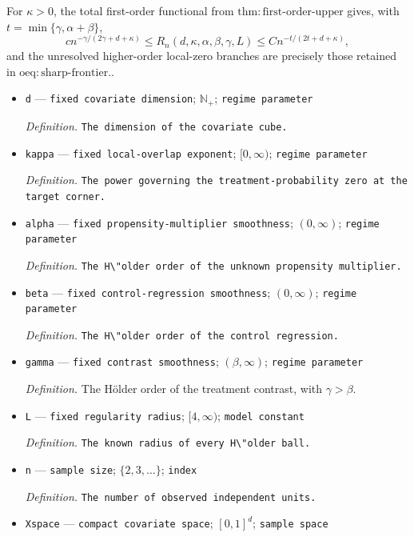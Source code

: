 \documentclass{article}
\begin{document}
For \(\kappa>0\), the total first-order functional from \(\mathrm{thm:first\mbox{-}order\mbox{-}upper}\) gives, with \(t=\min\{\gamma,\alpha+\beta\}\),
\[
 c n^{-\gamma/(2\gamma+d+\kappa)}
 \leq R_n(d,\kappa,\alpha,\beta,\gamma,L)
 \leq C n^{-t/(2t+d+\kappa)},
\]
and the unresolved higher-order local-zero branches are precisely those retained in \(\mathrm{oeq:sharp\mbox{-}frontier}\)..
\begin{itemize}
  \item \texttt{d} --- \texttt{fixed covariate dimension}; \(\mathbb N_{+}\); \texttt{regime parameter}
  \par\smallskip\noindent\emph{Definition.} \texttt{The dimension of the covariate cube.}
  \item \texttt{kappa} --- \texttt{fixed local-\allowbreak{}overlap exponent}; \([0,\infty)\); \texttt{regime parameter}
  \par\smallskip\noindent\emph{Definition.} \texttt{The power governing the treatment-\allowbreak{}probability zero at the target corner.}
  \item \texttt{alpha} --- \texttt{fixed propensity-\allowbreak{}multiplier smoothness}; \((0,\infty)\); \texttt{regime parameter}
  \par\smallskip\noindent\emph{Definition.} \texttt{The H\textbackslash{}\allowbreak{}"older order of the unknown propensity multiplier.}
  \item \texttt{beta} --- \texttt{fixed control-\allowbreak{}regression smoothness}; \((0,\infty)\); \texttt{regime parameter}
  \par\smallskip\noindent\emph{Definition.} \texttt{The H\textbackslash{}\allowbreak{}"older order of the control regression.}
  \item \texttt{gamma} --- \texttt{fixed contrast smoothness}; \((\beta,\infty)\); \texttt{regime parameter}
  \par\smallskip\noindent\emph{Definition.} The H\"older order of the treatment contrast, with \(\gamma>\beta\).
  \item \texttt{L} --- \texttt{fixed regularity radius}; \([4,\infty)\); \texttt{model constant}
  \par\smallskip\noindent\emph{Definition.} \texttt{The known radius of every H\textbackslash{}\allowbreak{}"older ball.}
  \item \texttt{n} --- \texttt{sample size}; \(\{2,3,\ldots\}\); \texttt{index}
  \par\smallskip\noindent\emph{Definition.} \texttt{The number of observed independent units.}
  \item \texttt{Xspace} --- \texttt{compact covariate space}; \([0,1]^d\); \texttt{sample space}

\end{itemize}
\end{document}
